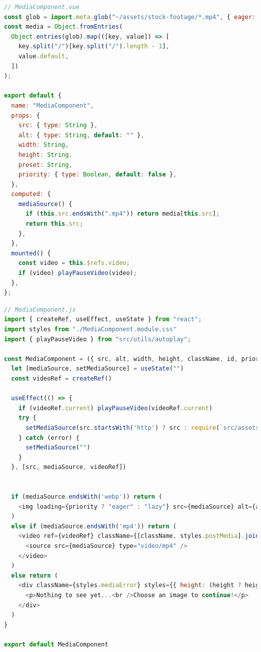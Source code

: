 \documentclass[a4paper, 10pt]{article}
\begin{document}
\begin{lstlisting}[caption=MediaComponent in Nuxt (Script), label={lst:Nuxt:MediaComponent:Script}, language=JavaScript, firstnumber=13, escapechar=°]
// MediaComponent.vue
const glob = import.meta.glob("~/assets/stock-footage/*.mp4", { eager: true });°\label{line:Nuxt:MediaComponent:imageImport}°
const media = Object.fromEntries(
  Object.entries(glob).map(([key, value]) => [
    key.split("/")[key.split("/").length - 1],
    value.default,
  ])
);

export default {
  name: "MediaComponent",
  props: {
    src: { type: String },
    alt: { type: String, default: "" },
    width: String,
    height: String,
    preset: String,
    priority: { type: Boolean, default: false },
  },
  computed: {
    mediaSource() {
      if (this.src.endsWith(".mp4")) return media[this.src];
      return this.src;
    },
  },
  mounted() {
    const video = this.$refs.video;
    if (video) playPauseVideo(video);
  },
};
\end{lstlisting}

\begin{lstlisting}[caption=MediaComponent in React, label={lst:React:MediaComponent}, language=JavaScript, escapechar=°]
// MediaComponent.js
import { createRef, useEffect, useState } from "react";
import styles from "./MediaComponent.module.css"
import { playPauseVideo } from "src/utils/autoplay";

const MediaComponent = ({ src, alt, width, height, className, id, priority = false }) => {
  let [mediaSource, setMediaSource] = useState("")
  const videoRef = createRef()

  useEffect(() => {
    if (videoRef.current) playPauseVideo(videoRef.current)
    try {
      setMediaSource(src.startsWith('http') ? src : require(`src/assets/stock-footage/${src}`))°\label{line:React:MediaComponent:imageImport}°
    } catch (error) {
      setMediaSource("")
    }
  }, [src, mediaSource, videoRef])


  if (mediaSource.endsWith('webp')) return (
    <img loading={priority ? "eager" : "lazy"} src={mediaSource} alt={alt} width={width} height={height} className={[className, styles.postMedia].join(" ")} id={id} />
  )
  else if (mediaSource.endsWith('mp4')) return (
    <video ref={videoRef} className={[className, styles.postMedia].join(" ")} id={id} width={width} preload="metadata" controls controlsList="nodownload,nofullscreen,noremoteplayback" disablePictureInPicture loop muted >
      <source src={mediaSource} type="video/mp4" />
    </video>
  )
  else return (
    <div className={styles.mediaError} styles={{ height: (height ? height + 'px' : '300px'), width: width.endsWith("%") ? width : width + "px" }}>
      <p>Nothing to see yet...<br />Choose an image to continue!</p>
    </div>
  )
}

export default MediaComponent
\end{lstlisting}
\end{document}
